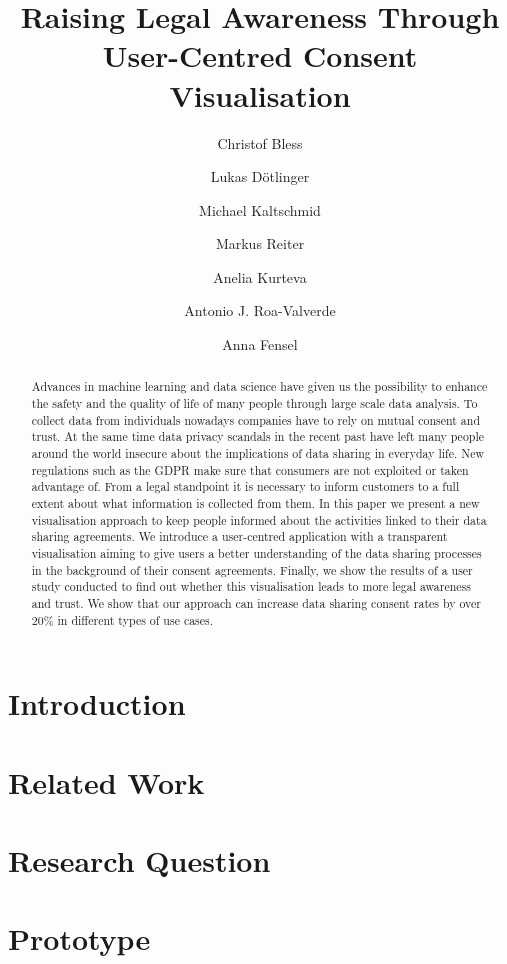 \documentclass{llncs}
\title{Raising Legal Awareness Through User-Centred Consent Visualisation}
\author{Christof Bless \and Lukas Dötlinger \and Michael Kaltschmid \and Markus Reiter \and Anelia Kurteva \and Antonio J. Roa-Valverde \and Anna Fensel }
\institute{Institute of Computer Science, University of Innsbruck}
\begin{document}
\maketitle

\begin{abstract}
  Advances in machine learning and data science have given us the
  possibility to enhance the safety and the quality of life of many people through large scale data analysis. To
  collect data from individuals nowadays companies have to rely on mutual
  consent and trust. At the
  same time data privacy scandals in the recent past have left many people around the world
  insecure about the implications of data sharing in everyday life.
  New regulations such as the GDPR make sure that consumers
  are not exploited or taken advantage of. From a legal standpoint it is
  necessary to inform customers to a full extent about what information is
  collected from them. In this paper we present a new visualisation approach
  to keep people informed about the activities linked to their data sharing
  agreements. We introduce a user-centred application with a transparent
  visualisation aiming to give users a better understanding of the data sharing
  processes in the background of their consent agreements. Finally, we show
  the results of a user study conducted to find out whether this
  visualisation leads to more legal awareness and trust.
  We show that our approach can increase data sharing consent rates by over 20\% in different types of use cases.
\end{abstract}


\section{Introduction}
\label{sec:introduction}


\section{Related Work}
\label{sec:related_work}


\section{Research Question}
\label{sec:research_question}


\section{Prototype}
\label{sec:prototyping}

\end{document}
